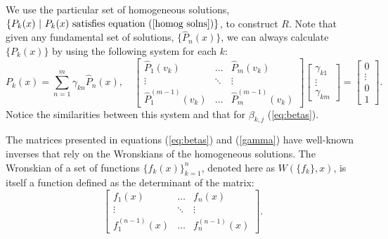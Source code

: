 \documentclass{sfuthesis}
\begin{document}
We use the particular set of homogeneous solutions, $\{ P_k(x) \ | \ P_k(x) \ \text{satisfies equation} \ (\ref{homog solns}) \}$, to construct $R$.
Note that given any fundamental set of solutions, $\{ \hat{P}_n(x) \}$, we can always calculate $\{ P_k(x) \}$ by using the following system for each $k$:
\begin{equation} \label{gamma}
P_k(x) = \sum_{n=1}^m \gamma_{kn} \hat{P}_n(x), \quad 
\begin{bmatrix} \hat{P}_1(v_k) & \dots & \hat{P}_m(v_k)
\\ \vdots & \ddots & \vdots
\\ \hat{P}_1^{(m-1)}(v_k) & \dots & \hat{P}_m^{(m-1)}(v_k) \end{bmatrix}
\begin{bmatrix} \gamma_{k1} \\ \vdots \\ \gamma_{km} \end{bmatrix} =
\begin{bmatrix} 0 \\ \vdots \\ 0 \\ 1 \end{bmatrix} .
\end{equation}
Notice the similarities between this system and that for $\beta_{k,j}$ (\ref{eq:betas}).

The matrices presented in equations (\ref{eq:betas}) and (\ref{gamma}) have well-known inverses that rely on the Wronskians of the homogeneous solutions.
The Wronskian of a set of functions $\{ f_k(x) \}_{k=1}^n$, denoted here as $W( \{ f_k \}, x)$, is itself a function defined as the determinant of the matrix:
\begin{equation}
\begin{bmatrix} f_1(x) & \dots & f_n(x) \\ \vdots & \ddots & \vdots \\ f^{(n-1)}_1(x) & \dots & f_n^{(n-1)}(x) \end{bmatrix} .
\end{equation}
\end{document}
